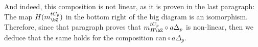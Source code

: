And indeed, this composition is not linear, as it is proven in the last paragraph: The map $H(m_{\bZ}^{tC_p})$ in the bottom right of the big diagram is an isomorphism. Therefore, since that paragraph proves that $m_{H\bZ}^{tC_p}\circ a\Delta_p$ is non-linear, then we deduce that the same holds for the composition $\mathrm{can}\circ a\Delta_p$.